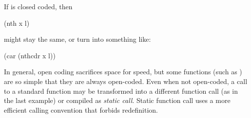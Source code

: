 If  is closed coded, then

\begin{lisp}
(nth x l)
\end{lisp}

might stay the same, or turn into something like:

\begin{lisp}
(car (nthcdr x l))
\end{lisp}

In general, open coding sacrifices space for speed, but some functions (such as
) are so simple that they are always open-coded.  Even when not
open-coded, a call to a standard function may be transformed into a
different function call (as in the last example) or compiled as {\em
static call}. Static function call uses a more efficient calling
convention that forbids redefinition.
